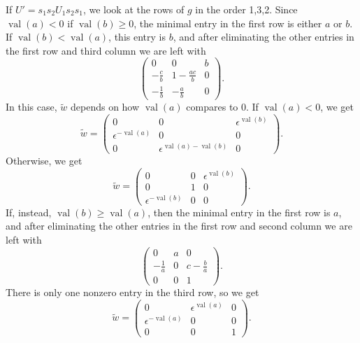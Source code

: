 \documentclass{amsart}
\theoremstyle{definition}
\def\e{\epsilon}
\def\w{\widetilde{w}}
\def\val{\mathop{\mathrm{val}}}
\begin{document}
  If $U' = s_1s_2 U_1 s_2s_1$, we look at the rows of $g$ in the order 1,3,2.
  Since $\val(a) < 0$ if $\val(b) \ge 0$, the minimal entry in the first row is
  either $a$ or $b$.  If $\val(b) < \val(a)$, this entry is $b$, and after
  eliminating the other entries in the first row and third column we are left
  with
  \begin{equation}\label{eq:w1-row1-b-less-a}
    \begin{pmatrix}
      0 & 0 & b \\
      -\frac{c}{b} & 1 - \frac{ac}{b} & 0 \\
      -\frac{1}{b} & -\frac{a}{b} & 0
    \end{pmatrix}.
  \end{equation}
  In this case, $\w$ depends on how $\val(a)$ compares to 0.  If $\val(a) < 0$,
  we get
  \begin{equation*}\w = \begin{pmatrix}
      0 & 0 & \e^{\val(b)} \\
      \e^{-\val(a)} & 0 & 0 \\
      0 & \e^{\val(a) - \val(b)} & 0  
    \end{pmatrix}.
  \end{equation*}
  Otherwise, we get 
  \begin{equation*}\w = \begin{pmatrix}
      0 & 0 & \e^{\val(b)} \\
      0 & 1 & 0 \\
      \e^{-\val(b)} & 0 & 0
    \end{pmatrix}.
  \end{equation*}
  If, instead, $\val(b) \ge \val(a)$, then the minimal entry in the first row
  is $a$, and after eliminating the other entries in the first row and second
  column we are left with
  \begin{equation}\label{eq:w1-row1-b-ge-a}
    \begin{pmatrix}
      0 & a & 0 \\
      -\frac{1}{a} & 0 & c - \frac{b}{a} \\
      0 & 0 & 1
    \end{pmatrix}.
  \end{equation}
  There is only one nonzero entry in the third row, so we get
  \begin{equation*}
    \w = \begin{pmatrix}
      0 & \e^{\val(a)} & 0 \\
      \e^{-\val(a)} & 0 & 0 \\
      0 & 0 & 1
    \end{pmatrix}.
  \end{equation*}
\end{document}
